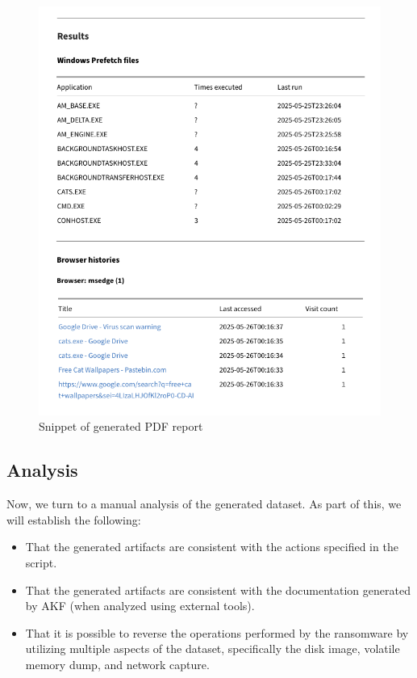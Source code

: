 \documentclass[final,5p,times,twocolumn]{elsarticle}
\begin{document}
\begin{figure}[htbp]
\centering
\includegraphics[width=1\linewidth]{pdf-sample-scenario.png}
\caption{Snippet of generated PDF report}\label{fig:pdf-sample}
\end{figure}

\subsection{Analysis}\label{analysis}

Now, we turn to a manual analysis of the generated dataset. As part of
this, we will establish the following:

\begin{itemize}
\item
  That the generated artifacts are consistent with the actions specified
  in the script.
\item
  That the generated artifacts are consistent with the documentation
  generated by AKF (when analyzed using external tools).
\item
  That it is possible to reverse the operations performed by the
  ransomware by utilizing multiple aspects of the dataset, specifically
  the disk image, volatile memory dump, and network capture.
\end{itemize}
\end{document}
